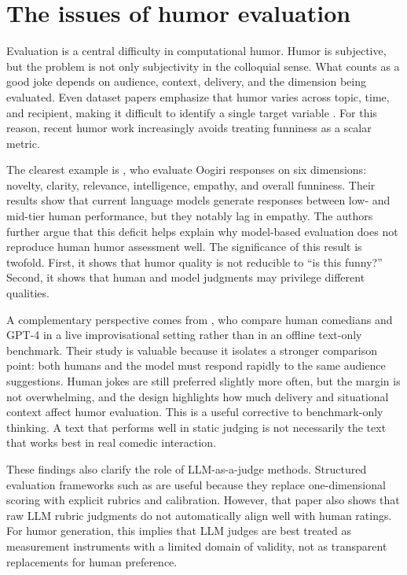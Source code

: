 \section{The issues of humor evaluation}

Evaluation is a central difficulty in computational humor. Humor is subjective, but the problem is not only subjectivity in the colloquial sense. What counts as a good joke depends on audience, context, delivery, and the dimension being evaluated. Even dataset papers emphasize that humor varies across topic, time, and recipient, making it difficult to identify a single target variable \citep{weller2020rjokes}. For this reason, recent humor work increasingly avoids treating funniness as a scalar metric.

The clearest example is \citet{Sakabe2025}, who evaluate Oogiri responses on six dimensions: novelty, clarity, relevance, intelligence, empathy, and overall funniness. Their results show that current language models generate responses between low- and mid-tier human performance, but they notably lag in empathy. The authors further argue that this deficit helps explain why model-based evaluation does not reproduce human humor assessment well. The significance of this result is twofold. First, it shows that humor quality is not reducible to ``is this funny?'' Second, it shows that human and model judgments may privilege different qualities.

A complementary perspective comes from \citet{winters2025evaluating}, who compare human comedians and GPT-4 in a live improvisational setting rather than in an offline text-only benchmark. Their study is valuable because it isolates a stronger comparison point: both humans and the model must respond rapidly to the same audience suggestions. Human jokes are still preferred slightly more often, but the margin is not overwhelming, and the design highlights how much delivery and situational context affect humor evaluation. This is a useful corrective to benchmark-only thinking. A text that performs well in static judging is not necessarily the text that works best in real comedic interaction.

These findings also clarify the role of LLM-as-a-judge methods. Structured evaluation frameworks such as \citet{Hashemi2024} are useful because they replace one-dimensional scoring with explicit rubrics and calibration. However, that paper also shows that raw LLM rubric judgments do not automatically align well with human ratings. For humor generation, this implies that LLM judges are best treated as measurement instruments with a limited domain of validity, not as transparent replacements for human preference.

